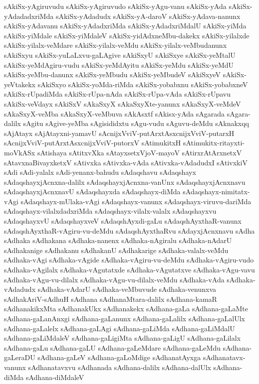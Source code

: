 {sAkiSx-yAgiruvudu
sAkiSx-yAgiruvudo
sAkiSx-yAgu-vanu
sAkiSx-yAda
sAkiSx-yAdadadxriMda
sAkiSx-yAdadudx
sAkiSx-yA-daroV
sAkiSx-yAdava-nanunx
sAkiSx-yAdavanu
sAkiSx-yAdadxriMda
sAkiSx-yAdadxriMdalU
sAkiSx-yiMda
sAkiSx-yiMdale
sAkiSx-yiMdaleV
sAkiSx-yidAdxneMbu-dakekx
sAkiSx-yilalxde
sAkiSx-yilalx-veMdare
sAkiSx-yilalx-veMdu
sAkiSx-yilalx-veMbudanunx
sAkiSxyu
sAkiSx-yuLaLxvu-gaLAgive
sAkiSxyU
sAkiSxye
sAkiSx-yeMtalU
sAkiSx-yeMdAgiru-vudu
sAkiSx-yeMdAyitu
sAkiSx-yeMdu
sAkiSx-yeMdU
sAkiSx-yeMbu-danunx
sAkiSx-yeMbudu
sAkiSx-yeMbudeV
sAkiSxyeV
sAkiSx-yeVtakekx
sAkiSxyo
sAkiSx-yoMda-riMda
sAkiSx-yobabxnu
sAkiSx-yobabxneV
sAkiSx-rUpadiMda
sAkiSx-rUpa-nAda
sAkiSx-rUpa-vAda
sAkiSx-rUpavu
sAkiSx-veVdayx
sAkiSxV
sAkaSxyX
sAkaSxyXte-yanunx
sAkaSxyX-veMdeV
sAkaSxyX-veMba
sAkaSxyX-veMbuva
sAkAsxtf
sAkisx-yAda
sAgarada
sAgara-dalilx
sAgitu
sAgive-yeMba
sAgisididxtu
sAgu-vudu
sAguvu-deMdu
sAknakxqq
sAjAtayx
sAjAtayxni-yamavU
sAcnijxVviV-putArxtAsxcnijxVviV-putarxH
sAcnijxVviV-putArxtAsxcnijxVviV-putorxV
sAtimukitxH
sAtimukitx-ritayxti-moVkASx
sAtishaya
sAtitxvXka
sAtayxsetxVjoV-mayoV
sAtirxrAtArxnetxV
sAtavxnaBivayxketxV
sAtivxka
sAtivxka-vAda
sAtivxka-vAdadudxI
sAtivxkiV
sAdi
sAdi-yalalx
sAdi-yenanx-bahudu
sAdaqshavu
sAdaqshayx
sAdaqshayxjAcnxna-dalilx
sAdaqshayxjAcnxna-vanUnx
sAdaqshayxjAcnxnavu
sAdaqshayxjAcnxnavU
sAdaqshayxda
sAdaqshayx-diMda
sAdaqshayx-nimitatx-vAgi
sAdaqshayx-mUlaka-vAgi
sAdaqshayx-vanunx
sAdaqshayx-viruvu-dariMda
sAdaqshayx-vilalxdadxriMda
sAdaqshayx-vilalx-valalx
sAdaqshayxvu
sAdaqshayxvU
sAdaqshayxveV
sAdaqshAyxdi-gaLu
sAdaqshAyxthaR-vanunx
sAdaqshAyxthaR-vAgiru-vu-deMdu
sAdaqshAyxthaRvu
sAdayxjAcnxnavu
sAdha
sAdhaka
sAdhakana
sAdhaka-nanenx
sAdhaka-nAgiralu
sAdhaka-nAdarU
sAdhakanige
sAdhakanu
sAdhakanU
sAdhakarige
sAdhaka-valalx-veMdu
sAdhaka-vAgi
sAdhaka-vAgide
sAdhaka-vAgiru-vu-deMdu
sAdhaka-vAgiru-vudo
sAdhaka-vAgilalx
sAdhaka-vAgutatxde
sAdhaka-vAgutatxve
sAdhaka-vAgu-vavu
sAdhaka-vAgu-vu-dilalx
sAdhaka-vAgu-vu-dilalx-veMdu
sAdhaka-vAda
sAdhaka-vAdadudx
sAdhaka-vAdarU
sAdhaka-veMbuvude
sAdhaka-venunxva
sAdhakAriV-sAdhuH
sAdhana
sAdhanaMtara-dalilx
sAdhana-kamaR
sAdhanakikxMta
sAdhanakUkx
sAdhanakekx
sAdhana-gaLa
sAdhana-gaLaMte
sAdhana-gaLanAnxgi
sAdhana-gaLanunx
sAdhana-gaLalilx
sAdhana-gaLalUlx
sAdhana-gaLalelx
sAdhana-gaLAgi
sAdhana-gaLiMda
sAdhana-gaLiMdalU
sAdhana-gaLiMdaleV
sAdhana-gaLigiMta
sAdhana-gaLigU
sAdhana-gaLilalx
sAdhana-gaLu
sAdhana-gaLU
sAdhana-gaLeMdare
sAdhana-gaLeMdu
sAdhana-gaLeraDU
sAdhana-gaLeV
sAdhana-gaLoMdige
sAdhanatAyxga
sAdhanatavx-vanunx
sAdhanatavxvu
sAdhanada
sAdhana-dalilx
sAdhana-dalUlx
sAdhana-diMda
sAdhana-diMdaleV
}
